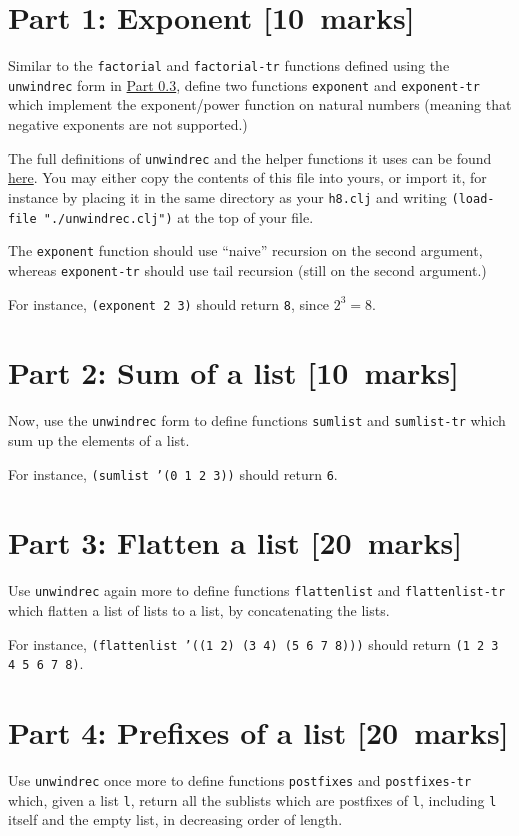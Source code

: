 \documentclass[11pt]{article}
\begin{document}
\section*{Part 1: Exponent              [10 marks]}
\label{sec:orgbc7e42f}
Similar to the \texttt{factorial} and \texttt{factorial-tr} functions defined
using the \texttt{unwindrec} form in \hyperref[sec:org83fb7fa]{Part 0.3},
define two functions \texttt{exponent} and \texttt{exponent-tr} which
implement the exponent/power function on natural numbers
(meaning that negative exponents are not supported.)

The full definitions of \texttt{unwindrec} and the helper functions it uses
can be found \href{./src/h8/unwindrec.clj}{here}. You may either copy the contents of this file into yours,
or import it, for instance by placing it in the same directory
as your \texttt{h8.clj} and writing \texttt{(load-file "./unwindrec.clj")} at the top of your file.

The \texttt{exponent} function should use “naive” recursion on the second argument,
whereas \texttt{exponent-tr} should use tail recursion (still on the second argument.)

For instance, \texttt{(exponent 2 3)} should return \texttt{8}, since \(2^{3} = 8\).

\section*{Part 2: Sum of a list         [10 marks]}
\label{sec:orgfb6d905}
Now, use the \texttt{unwindrec} form to define functions \texttt{sumlist} and \texttt{sumlist-tr} which
sum up the elements of a list.

For instance, \texttt{(sumlist '(0 1 2 3))} should return \texttt{6}.

\section*{Part 3: Flatten a list        [20 marks]}
\label{sec:org27eefd7}
Use \texttt{unwindrec} again more to define functions \texttt{flattenlist} and \texttt{flattenlist-tr} which
flatten a list of lists to a list, by concatenating the lists.

For instance, \texttt{(flattenlist '((1 2) (3 4) (5 6 7 8)))} should return \texttt{(1 2 3 4 5 6 7 8)}.

\section*{Part 4: Prefixes of a list    [20 marks]}
\label{sec:orgfd80d26}
Use \texttt{unwindrec} once more to define functions \texttt{postfixes} and \texttt{postfixes-tr} which,
given a list \texttt{l}, return all the sublists which are postfixes of \texttt{l},
including \texttt{l} itself and the empty list, in decreasing order of length.
\end{document}
